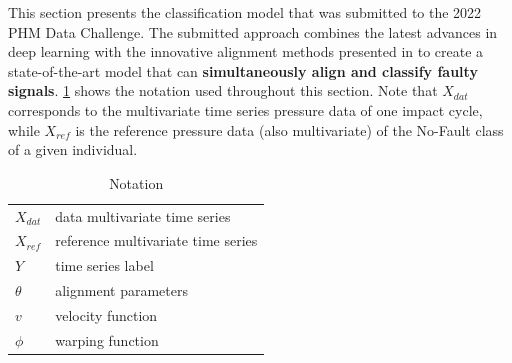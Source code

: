 This section presents the classification model that was submitted to the 2022 PHM Data Challenge. 
The submitted approach combines the latest advances in deep learning with the innovative alignment methods presented in \cite{martinez2022closed} to create a state-of-the-art model that can \textbf{simultaneously align and classify faulty signals}. %
\cref{tab:phm_notation} shows the notation used throughout this section. Note that $X_{dat}$ corresponds to the multivariate time series pressure data of one impact cycle, while $X_{ref}$ is the reference pressure data (also multivariate) of the No-Fault class of a given individual. 
\begin{table}[!htb]
    \caption{Notation}
    \label{tab:phm_notation}
    \begin{center}
    \begin{tabular}{ll}
    \toprule
    $X_{dat}$ & data multivariate time series \\
    $X_{ref}$ & reference multivariate time series \\
    $Y$ & time series label \\
    $\theta$ & alignment parameters \\
    $v$ & velocity function \\
    $\phi$ & warping function \\ \bottomrule
    \end{tabular}
\end{center}
\end{table}


